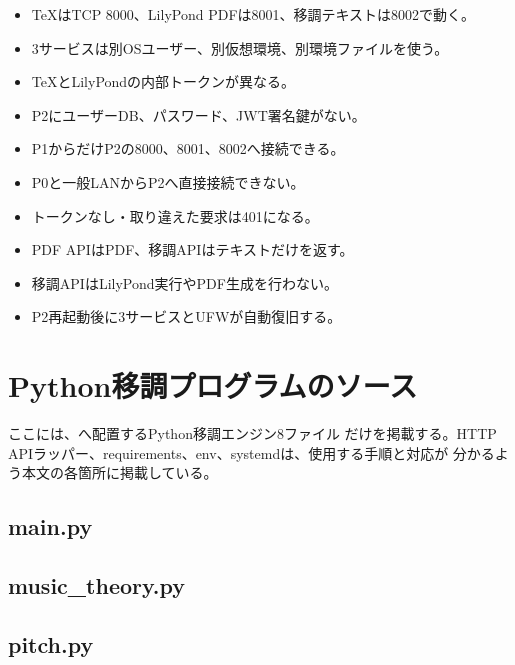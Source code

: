 \documentclass[uplatex,a4paper,11pt]{jsarticle}
\begin{document}
\begin{itemize}
  \item[$\square$] TeXはTCP 8000、LilyPond PDFは8001、移調テキストは8002で動く。
  \item[$\square$] 3サービスは別OSユーザー、別仮想環境、別環境ファイルを使う。
  \item[$\square$] TeXとLilyPondの内部トークンが異なる。
  \item[$\square$] P2にユーザーDB、パスワード、JWT署名鍵がない。
  \item[$\square$] P1からだけP2の8000、8001、8002へ接続できる。
  \item[$\square$] P0と一般LANからP2へ直接接続できない。
  \item[$\square$] トークンなし・取り違えた要求は401になる。
  \item[$\square$] PDF APIはPDF、移調APIはテキストだけを返す。
  \item[$\square$] 移調APIはLilyPond実行やPDF生成を行わない。
  \item[$\square$] P2再起動後に3サービスとUFWが自動復旧する。
\end{itemize}

\clearpage
\appendix
\section{Python移調プログラムのソース}

ここには、へ配置するPython移調エンジン8ファイル
だけを掲載する。HTTP APIラッパー、requirements、env、systemdは、使用する手順と対応が
分かるよう本文の各箇所に掲載している。

\subsection{main.py}


\subsection{music\_theory.py}


\subsection{pitch.py}

\end{document}
